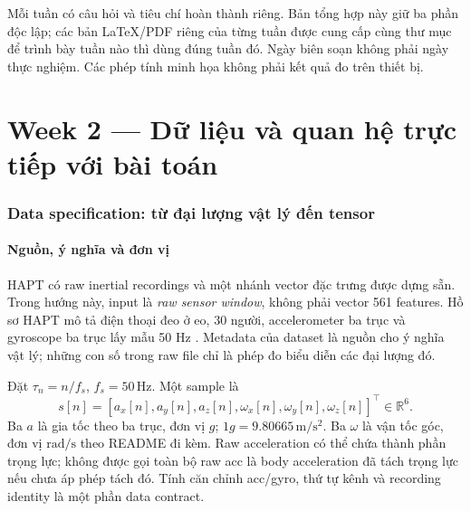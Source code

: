 \documentclass[11pt,a4paper]{article}
\newcommand{\R}{\mathbb R}
\theoremstyle{remark}
\begin{document}
Mỗi tuần có câu hỏi và tiêu chí hoàn thành riêng. Bản tổng hợp này giữ ba
phần độc lập; các bản LaTeX/PDF riêng của từng tuần được cung cấp cùng thư
mục để trình bày tuần nào thì dùng đúng tuần đó. Ngày biên soạn không phải
ngày thực nghiệm. Các phép tính minh họa không phải kết quả đo trên thiết bị.

\begingroup
\sloppy

\endgroup
\part{Week 2 --- Dữ liệu và quan hệ trực tiếp với bài toán}
\section{Data specification: từ đại lượng vật lý đến tensor}
\subsection{Nguồn, ý nghĩa và đơn vị}
HAPT có raw inertial recordings và một nhánh vector đặc trưng được dựng sẵn.
Trong hướng này, input là \emph{raw sensor window}, không phải vector
561 features. Hồ sơ HAPT mô tả điện thoại đeo ở eo, 30 người, accelerometer
ba trục và gyroscope ba trục lấy mẫu 50 Hz \cite{hapt}. Metadata của dataset
là nguồn cho ý nghĩa vật lý; những con số trong raw file chỉ là phép đo
biểu diễn các đại lượng đó.

Đặt $\tau_n=n/f_s$, $f_s=50\,\mathrm{Hz}$. Một sample là
\begin{equation}
 s[n]=[a_x[n],a_y[n],a_z[n],\omega_x[n],\omega_y[n],\omega_z[n]]^\top
 \in\R^6.
 \label{eq:sample}
\end{equation}
Ba $a$ là gia tốc theo ba trục, đơn vị $g$; $1g=9.80665\,\mathrm{m/s^2}$.
Ba $\omega$ là vận tốc góc, đơn vị $\mathrm{rad/s}$ theo README đi kèm.
Raw acceleration có thể chứa thành phần trọng lực; không được gọi toàn bộ
raw acc là body acceleration đã tách trọng lực nếu chưa áp phép tách đó.
Tính căn chỉnh acc/gyro, thứ tự kênh và recording identity là một phần data
contract.
\end{document}
